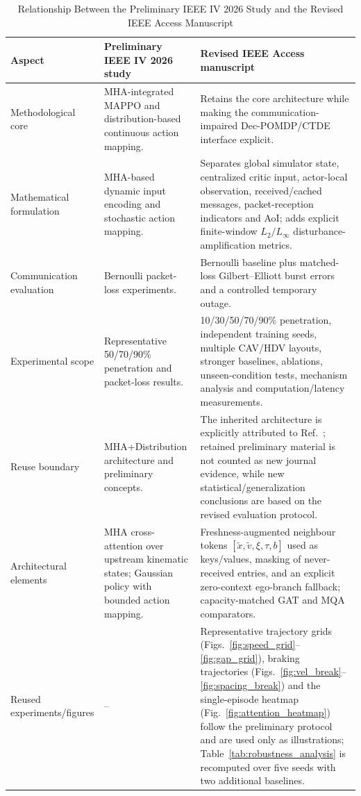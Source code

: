 \documentclass{ieeeaccess}
\begin{document}
\begin{table}[htbp]
\centering
\caption{Relationship Between the Preliminary IEEE IV 2026 Study and the Revised IEEE Access Manuscript}
\label{tab:iv_access_novelty}
\renewcommand{\arraystretch}{1.15}
\begin{tabularx}{\textwidth}{|p{3.1cm}|X|X|}
\hline
\textbf{Aspect} & \textbf{Preliminary IEEE IV 2026 study} & \textbf{Revised IEEE Access manuscript} \\ \hline
Methodological core & MHA-integrated MAPPO and distribution-based continuous action mapping. & Retains the core architecture while making the communication-impaired Dec-POMDP/CTDE interface explicit. \\ \hline
Mathematical formulation & MHA-based dynamic input encoding and stochastic action mapping. & Separates global simulator state, centralized critic input, actor-local observation, received/cached messages, packet-reception indicators and AoI; adds explicit finite-window $L_2/L_\infty$ disturbance-amplification metrics. \\ \hline
Communication evaluation & Bernoulli packet-loss experiments. & Bernoulli baseline plus matched-loss Gilbert--Elliott burst errors and a controlled temporary outage. \\ \hline
Experimental scope & Representative 50/70/90\% penetration and packet-loss results. & 10/30/50/70/90\% penetration, independent training seeds, multiple CAV/HDV layouts, stronger baselines, ablations, unseen-condition tests, mechanism analysis and computation/latency measurements. \\ \hline
Reuse boundary & MHA+Distribution architecture and preliminary concepts. & The inherited architecture is explicitly attributed to Ref.~\cite{cai2026integrating}; retained preliminary material is not counted as new journal evidence, while new statistical/generalization conclusions are based on the revised evaluation protocol. \\ \hline
Architectural elements & MHA cross-attention over upstream kinematic states; Gaussian policy with bounded action mapping. & Freshness-augmented neighbour tokens $[\tilde x,\tilde v,\xi,\tau,b]$ used as keys/values, masking of never-received entries, and an explicit zero-context ego-branch fallback; capacity-matched GAT and MQA comparators. \\ \hline
Reused experiments/figures & -- & Representative trajectory grids (Figs.~\ref{fig:speed_grid}--\ref{fig:gap_grid}), braking trajectories (Figs.~\ref{fig:vel_break}--\ref{fig:spacing_break}) and the single-episode heatmap (Fig.~\ref{fig:attention_heatmap}) follow the preliminary protocol and are used only as illustrations; Table~\ref{tab:robustness_analysis} is recomputed over five seeds with two additional baselines. \\ \hline %

\end{tabularx}
\end{table}
\end{document}
